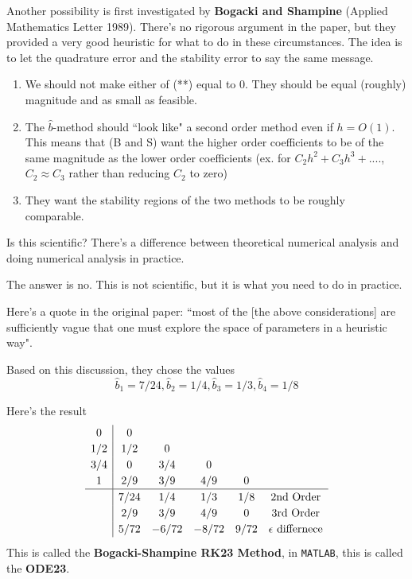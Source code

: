 \documentclass{article}
\begin{document}
Another possibility is first investigated by \textbf{Bogacki and Shampine} (Applied Mathematics Letter 1989). There's no rigorous argument in the paper, but they provided a very good heuristic for what to do in these circumstances. The idea is to let the quadrature error and the stability error to say the same message.
\begin{enumerate}
    \item We should not make either of (**) equal to $0$. They should be equal (roughly) magnitude and as small as feasible.
    \item The $\hat{b}$-method should ``look like" a second order method even if $h = O(1)$. This means that (B and S) want the higher order coefficients to be of the same magnitude as the lower order coefficients (ex. for $C_2 h^2 + C_3 h^3 + ....$, $C_2 \approx C_3$ rather than reducing $C_2$ to zero)
    \item They want the stability regions of the two methods to be roughly comparable.
\end{enumerate}

\begin{question}
    Is this scientific? There's a difference between theoretical numerical analysis and doing numerical analysis in practice.
\end{question}

The answer is no. This is not scientific, but it is what you need to do in practice.

\begin{remark}
    Here's a quote in the original paper: ``most of the [the above considerations] are sufficiently vague that one must explore the space of parameters in a heuristic way". 
\end{remark}

Based on this discussion, they chose the values
\[\hat{b}_1 = 7/24, \hat{b}_2 = 1/4, \hat{b}_3 = 1/3, \hat{b}_4 = 1/8\]

Here's the result
    \[
\renewcommand\arraystretch{1.2}
\begin{array}
{c|ccccc}
0 & 0\\
1/2 & 1/2 & 0\\
3/4 & 0 & 3/4 & 0\\
1 & 2/9 & 3/9 & 4/9 & 0\\
\hline
& 7/24 & 1/4 & 1/3 & 1/8 & \text{2nd Order}\\
& 2/9 & 3/9 & 4/9 & 0 & \text{3rd Order}\\
& 5/72 & -6/72 & -8/72 & 9/72 & \epsilon\text{ differnece}
\end{array}
\]
This is called the \textbf{Bogacki-Shampine RK23 Method}, in \texttt{MATLAB}, this is called the \textbf{ODE23}.\\
\end{document}
